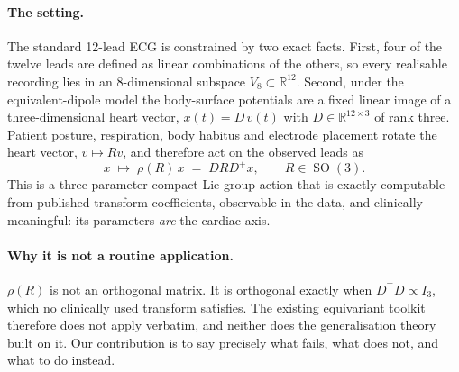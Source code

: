 \documentclass[11pt]{article}
\theoremstyle{definition}
\DeclareMathOperator{\SO}{SO}
\newcommand{\R}{\mathbb{R}}
\newcommand{\Veight}{V_{8}}
\newcommand{\rhoext}{\rho}
\begin{document}
\paragraph{The setting.} The standard 12-lead ECG is constrained by two exact facts.
First, four of the twelve leads are defined as linear combinations of the others, so
every realisable recording lies in an $8$-dimensional subspace $\Veight \subset \R^{12}$.
Second, under the equivalent-dipole model the body-surface potentials are a fixed
linear image of a three-dimensional heart vector, $x(t) = D\,v(t)$ with $D \in
\R^{12\times 3}$ of rank three. Patient posture, respiration, body habitus and
electrode placement rotate the heart vector, $v \mapsto Rv$, and therefore act on the
observed leads as
\begin{equation}\label{eq:action}
  x \;\longmapsto\; \rhoext(R)\,x \;=\; D R D^{+} x, \qquad R \in \SO(3).
\end{equation}
This is a three-parameter compact Lie group action that is exactly computable from
published transform coefficients, observable in the data, and clinically meaningful:
its parameters \emph{are} the cardiac axis.

\paragraph{Why it is not a routine application.} $\rhoext(R)$ is not an orthogonal
matrix. It is orthogonal exactly when $D^{\top}D \propto I_3$, which no clinically
used transform satisfies. The existing equivariant toolkit therefore does not apply
verbatim, and neither does the generalisation theory built on it. Our contribution is
to say precisely what fails, what does not, and what to do instead.
\end{document}
